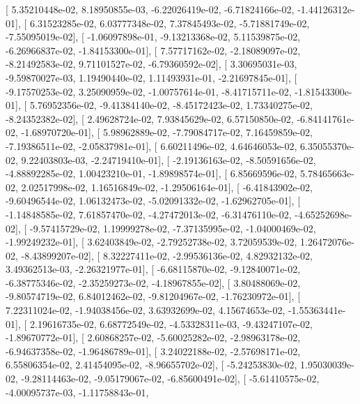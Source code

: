 \documentclass{article}
\begin{document}
       [  5.35210448e-02,   8.18950855e-03,  -6.22026419e-02,
         -6.71824166e-02,  -1.44126312e-01],
       [  6.31523285e-02,   6.03777348e-02,   7.37845493e-02,
         -5.71881749e-02,  -7.55095019e-02],
       [ -1.06097898e-01,  -9.13213368e-02,   5.11539875e-02,
         -6.26966837e-02,  -1.84153300e-01],
       [  7.57717162e-02,  -2.18089097e-02,  -8.21492583e-02,
          9.71101527e-02,  -6.79360592e-02],
       [  3.30695031e-03,  -9.59870027e-03,   1.19490440e-02,
          1.11493931e-01,  -2.21697845e-01],
       [ -9.17570253e-02,   3.25090959e-02,  -1.00757614e-01,
         -8.41715711e-02,  -1.81543300e-01],
       [  5.76952356e-02,  -9.41384140e-02,  -8.45172423e-02,
          1.73340275e-02,  -8.24352382e-02],
       [  2.49628724e-02,   7.93845629e-02,   6.57150850e-02,
         -6.84141761e-02,  -1.68970720e-01],
       [  5.98962889e-02,  -7.79084717e-02,   7.16459859e-02,
         -7.19386511e-02,  -2.05837981e-01],
       [  6.60211496e-02,   4.64646053e-02,   6.35055370e-02,
          9.22403803e-03,  -2.24719410e-01],
       [ -2.19136163e-02,  -8.50591656e-02,  -4.88892285e-02,
          1.00423210e-01,  -1.89898574e-01],
       [  6.85669596e-02,   5.78465663e-02,   2.02517998e-02,
          1.16516849e-02,  -1.29506164e-01],
       [ -6.41843902e-02,  -9.60496544e-02,   1.06132473e-02,
         -5.02091332e-02,  -1.62962705e-01],
       [ -1.14848585e-02,   7.61857470e-02,  -4.27472013e-02,
         -6.31476110e-02,  -4.65252698e-02],
       [ -9.57415729e-02,   1.19999278e-02,  -7.37135995e-02,
         -1.04000469e-02,  -1.99249232e-01],
       [  3.62403849e-02,  -2.79252738e-02,   3.72059539e-02,
          1.26472076e-02,  -8.43899207e-02],
       [  8.32227411e-02,  -2.99536136e-02,   4.82932132e-02,
          3.49362513e-03,  -2.26321977e-01],
       [ -6.68115870e-02,  -9.12840071e-02,  -6.38775346e-02,
         -2.35259273e-02,  -4.18967855e-02],
       [  3.80488069e-02,  -9.80574719e-02,   6.84012462e-02,
         -9.81204967e-02,  -1.76230972e-01],
       [  7.22311024e-02,  -1.94038456e-02,   3.63932699e-02,
          4.15674653e-02,  -1.55363441e-01],
       [  2.19616735e-02,   6.68772549e-02,  -4.53328311e-03,
         -9.43247107e-02,  -1.89670772e-01],
       [  2.60868257e-02,  -5.60025282e-02,  -2.98963178e-02,
         -6.94637358e-02,  -1.96486789e-01],
       [  3.24022188e-02,  -2.57698171e-02,   6.55806354e-02,
          2.41454095e-02,  -8.96655702e-02],
       [ -5.24253830e-02,   1.95030039e-02,  -9.28114463e-02,
         -9.05179067e-02,  -6.85600491e-02],
       [ -5.61410575e-02,  -4.00095737e-03,  -1.11758843e-01,
\end{document}
